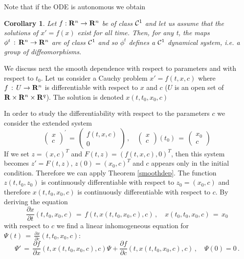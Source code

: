 \documentclass[12pt]{report}
\newcommand{\calC}{{\cal C}}
\newcommand{\bR}{{\bf R}}
\newtheorem{corollary}[theorem]{Corollary}
\def\to{\rightarrow}
\begin{document}
Note that if  the ODE is autonomous we obtain
\begin{corollary} Let $f: \bR^n \to \bR^n$  be of class $\calC^1$ and  
let us assume that the solutions of $x'=f(x)$ exist for all
time. Then, for any t, the maps $\phi^t \,:\, \bR^n \to \bR^n$ are of
class $\calC^1$ and so $\phi^t$ defines a $\calC^1$ dynamical system, i.e. a group 
of diffeomorphisms. 
\end{corollary}


We discuss next the smooth dependence with respect to parameters and with respect to $t_0$.
Let us consider a Cauchy problem $x'=f(t,x,c)$ where $f\,:\, U \to
\bR^n$ is differentiable with respect to $x$ and $c$ ($U$ is an open
set of $\bR\times \bR^n \times \bR^q$).  The solution is denoted 
$x(t,t_0,x_0,c)$

In order to study the differentiability with respect to the parameters $c$ 
we consider the extended system
\begin{equation}
\left( \begin{array}{cc} x \\ c \end{array} \right)^{'} \,=\, \left(
\begin{array}{cc} f(t,x,c) \\ 0 \end{array} \right) \,, \quad \left(
\begin{array}{cc} x \\ c \end{array} \right)(t_0) \,=\, \left(
\begin{array}{cc} x_0 \\ c \end{array} \right)
\end{equation}
If we set $z=(x,c)^T$ and $F(t,z)= (f(t,x,c) , 0)^T$, then this system
becomes $z'=F(t,z)$, $z(0)=(x_0,c)^T$ and $c$ appears only in the
initial condition. Therefore we can apply Theorem \ref{smoothdep}. The
function $z(t,t_0,z_0)$ is continuously differentiable with respect to 
$z_0=(x_0,c)$ and therefore $x(t,t_0,x_0,c)$ is continuously
differentiable with respect to $c$.  By deriving the equation
\begin{equation}
\frac{\partial x}{\partial t}(t,t_0,x_0,c) \,=\, f(t, x(t,t_0,x_0,c),
c) \,, \quad x(t_0,t_0,x_0,c)\,=\, x_0
\end{equation}
with respect to $c$ we find a linear inhomogeneous equation for
$\Psi(t) \,=\, \frac{\partial x}{\partial c}(t,t_0,x_0,c)$: 
\begin{equation}
\Psi' \,=\, \frac{\partial f}{\partial x}(t, x(t,t_0,x_0,c) ,c) \Psi +
\frac{\partial f}{\partial c}(t,x(t,t_0,x_0,c),c) \,, \quad \Psi(0)=0
\,.
\end{equation}
\end{document}
